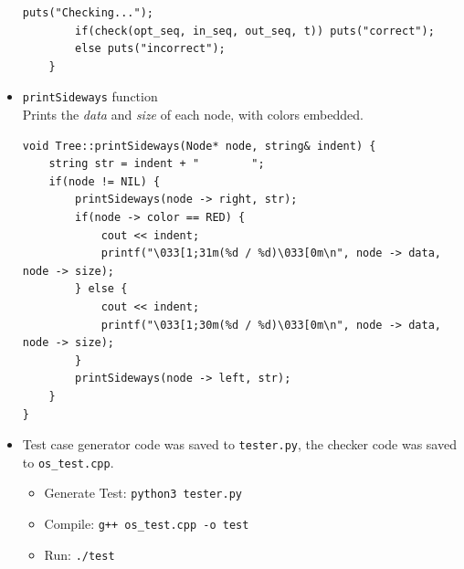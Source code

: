 \documentclass[12pt]{article}
\begin{document}
\begin{itemize}
\begin{lstlisting}[style=Cstyle]
		puts("Checking...");
		if(check(opt_seq, in_seq, out_seq, t)) puts("correct");
		else puts("incorrect");
	}
\end{lstlisting}
	\item \texttt{printSideways} function\\
	Prints the \textit{data} and \textit{size} of each node, with colors embedded.
\begin{lstlisting}[style=Cstyle]
void Tree::printSideways(Node* node, string& indent) {
	string str = indent + "        ";
	if(node != NIL) {
		printSideways(node -> right, str);
		if(node -> color == RED) {
			cout << indent;
			printf("\033[1;31m(%d / %d)\033[0m\n", node -> data, node -> size);
		} else {
			cout << indent;
			printf("\033[1;30m(%d / %d)\033[0m\n", node -> data, node -> size);
		}
		printSideways(node -> left, str);
	}
}
\end{lstlisting}
	\item Test case generator code was saved to \texttt{tester.py}, the checker code was saved to \texttt{os\_test.cpp}.
	\begin{itemize}
		\item Generate Test: \texttt{python3 tester.py}
		\item Compile: \texttt{g++ os\_test.cpp -o test}
		\item Run: \texttt{./test}
	\end{itemize}
\end{itemize}
\end{document}
